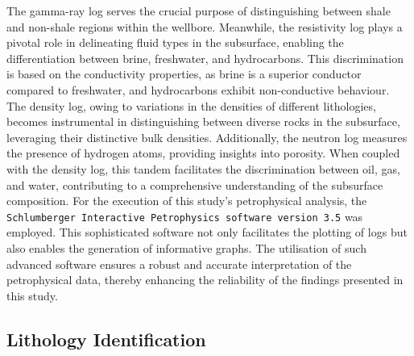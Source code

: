 \documentclass{gji}
\begin{document}
The gamma-ray log serves the crucial purpose of distinguishing between shale and non-shale regions within the wellbore.
Meanwhile, the resistivity log plays a pivotal role in delineating fluid types in the subsurface, enabling the differentiation between brine, freshwater, and hydrocarbons. 
This discrimination is based on the conductivity properties, as brine is a superior conductor compared to freshwater, and hydrocarbons exhibit non-conductive behaviour.
The density log, owing to variations in the densities of different lithologies, becomes instrumental in distinguishing between diverse rocks in the subsurface, leveraging their distinctive bulk densities.
Additionally, the neutron log measures the presence of hydrogen atoms, providing insights into porosity.
When coupled with the density log, this tandem facilitates the discrimination between oil, gas, and water, contributing to a comprehensive understanding of the subsurface composition.
For the execution of this study's petrophysical analysis, the {\tt Schlumberger Interactive Petrophysics software version 3.5} was employed.
This sophisticated software not only facilitates the plotting of logs but also enables the generation of informative graphs.
The utilisation of such advanced software ensures a robust and accurate interpretation of the petrophysical data, thereby enhancing the reliability of the findings presented in this study.

\subsection{Lithology Identification} \label{subsec:Lithology}
\end{document}
